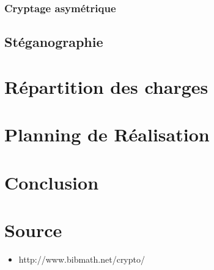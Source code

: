 \documentclass[a4paper,12pt]{article}
\begin{document}
			\subsubsection{Cryptage asymétrique}

		\subsection{Stéganographie}
	\newpage
	\section{Répartition des charges}
	\section{Planning de Réalisation} %
	\section{Conclusion}
	\section*{Source}
		\begin{itemize}
			\item  http://www.bibmath.net/crypto/
		\end{itemize}
\end{document}
